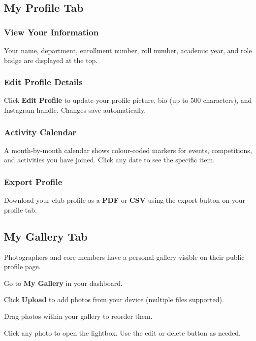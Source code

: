 \documentclass[12pt,a4paper]{article}
\begin{document}
\subsection{My Profile Tab}

\subsubsection{View Your Information}
Your name, department, enrollment number, roll number, academic year, and role badge are displayed at the top.

\subsubsection{Edit Profile Details}
Click \textbf{Edit Profile} to update your profile picture, bio (up to 500 characters), and Instagram handle. Changes save automatically.

\subsubsection{Activity Calendar}
A month-by-month calendar shows colour-coded markers for events, competitions, and activities you have joined. Click any date to see the specific item.

\subsubsection{Export Profile}
Download your club profile as a \textbf{PDF} or \textbf{CSV} using the export button on your profile tab.

\subsection{My Gallery Tab}

Photographers and core members have a personal gallery visible on their public profile page.

\begin{steps}
\item Go to \textbf{My Gallery} in your dashboard.
\item Click \textbf{Upload} to add photos from your device (multiple files supported).
\item Drag photos within your gallery to reorder them.
\item Click any photo to open the lightbox. Use the edit or delete button as needed.
\end{steps}
\end{document}
